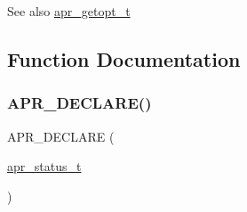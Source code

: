 \begin{DoxySeeAlso}{See also}
\mbox{\hyperlink{structapr__getopt__t}{apr\+\_\+getopt\+\_\+t}} 
\end{DoxySeeAlso}


\subsection{Function Documentation}
\mbox{\label{group__apr__getopt_ga29849181eb220ccc0407026401c6639a}} 
\subsubsection{\texorpdfstring{A\+P\+R\+\_\+\+D\+E\+C\+L\+A\+R\+E()}{APR\_DECLARE()}}
{\footnotesize\ttfamily A\+P\+R\+\_\+\+D\+E\+C\+L\+A\+RE (\begin{DoxyParamCaption}\item[{\mbox{\hyperlink{group__apr__errno_gaf76ee4543247e9fb3f3546203e590a6c}{apr\+\_\+status\+\_\+t}}}]{ }\end{DoxyParamCaption})}

